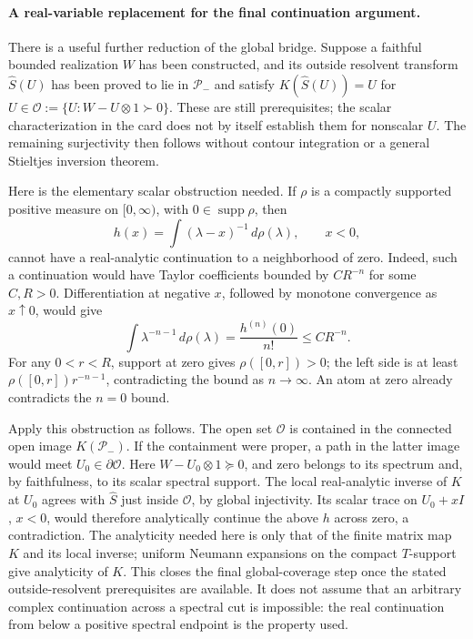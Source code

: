 \documentclass[11pt,a4paper]{article}
\begin{document}
\paragraph{A real-variable replacement for the final continuation argument.}
There is a useful further reduction of the global bridge.  Suppose a
faithful bounded realization \(W\) has been constructed, and its outside
resolvent transform \(\widehat S(U)\) has been proved to lie in
\(\mathcal P_-\) and satisfy \(K(\widehat S(U))=U\) for
\(U\in\mathcal O:=\{U:W-U\otimes1\succ0\}\).
These are still prerequisites; the scalar characterization in the card
does not by itself establish them for nonscalar \(U\).
The remaining surjectivity then follows without contour integration or a
general Stieltjes inversion theorem.

Here is the elementary scalar obstruction needed.  If \(\rho\) is a
compactly supported positive measure on \([0,\infty)\), with
\(0\in\operatorname{supp}\rho\), then
\[
 h(x)=\int(\lambda-x)^{-1}\,d\rho(\lambda),\qquad x<0,
\]
cannot have a real-analytic continuation to a neighborhood of zero.
Indeed, such a continuation would have Taylor coefficients bounded by
\(C R^{-n}\) for some \(C,R>0\).  Differentiation at negative \(x\),
followed by monotone convergence as \(x\uparrow0\), would give
\[
 \int\lambda^{-n-1}\,d\rho(\lambda)
   =\frac{h^{(n)}(0)}{n!}\leq C R^{-n}.
\]
For any \(0<r<R\), support at zero gives \(\rho([0,r])>0\); the left
side is at least \(\rho([0,r])r^{-n-1}\), contradicting the bound as
\(n\to\infty\).  An atom at zero already contradicts the \(n=0\) bound.

Apply this obstruction as follows.  The open set \(\mathcal O\) is
contained in the connected open image \(K(\mathcal P_-)\).  If the
containment were proper, a path in the latter image would meet
\(U_0\in\partial\mathcal O\).  Here
\(W-U_0\otimes1\succeq0\), and zero belongs to its spectrum and, by
faithfulness, to its scalar spectral support.  The local real-analytic
inverse of \(K\) at \(U_0\) agrees with \(\widehat S\) just inside
\(\mathcal O\), by global injectivity.  Its scalar trace on
\(U_0+xI\), \(x<0\), would therefore analytically continue the above
\(h\) across zero, a contradiction.  The analyticity needed here is only
that of the finite matrix map \(K\) and its local inverse; uniform
Neumann expansions on the compact \(T\)-support give analyticity of
\(K\).  This closes the final global-coverage step once the stated
outside-resolvent prerequisites are available.  It does not assume that
an arbitrary complex continuation across a spectral cut is impossible:
the real continuation from below a positive spectral endpoint is the
property used.
\end{document}
